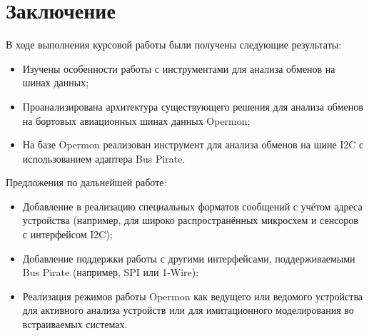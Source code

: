 \section{Заключение}

В ходе выполнения курсовой работы были получены следующие результаты:

\begin{itemize}
 \item Изучены особенности работы с инструментами для анализа обменов на шинах данных;
 \item Проанализирована архитектура существующего решения для анализа обменов на бортовых авиационных шинах данных Opermon;
 \item На базе Opermon реализован инструмент для анализа обменов на шине I2C с использованием адаптера Bus Pirate.
\end{itemize}

Предложения по дальнейшей работе:

\begin{itemize}
 \item Добавление в реализацию специальных форматов сообщений с учётом адреса устройства (например, для широко распространённых микросхем и сенсоров с интерфейсом I2C);
 \item Добавление поддержки работы с другими интерфейсами, поддерживаемыми Bus Pirate (например, SPI или 1-Wire);
 \item Реализация режимов работы Opermon как ведущего или ведомого устройства для активного анализа устройств или для имитационного моделирования во встраиваемых системах.
\end{itemize}

